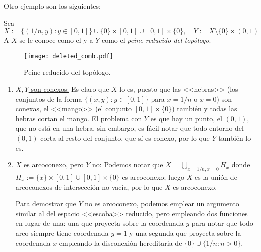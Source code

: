 \documentclass[topologia-analisis.tex]{subfiles}
\begin{document}
Otro ejemplo son los siguientes:
\begin{ex}
	Sea
	$$ X := \{(1/n, y) : y\in [0,1]\} \cup \{0\}\times[0,1] \cup [0,1]\times\{0\}, \quad Y := X \setminus \{0\} \times (0, 1) $$
	A $X$ se le conoce como el  y a $Y$ como el \textit{peine reducido del topólogo}.

	\begin{figure}[!hbt]
		\centering
		\texttt{[image: deleted\_comb.pdf]}
		\caption{Peine reducido del topólogo.}%
		\label{fig:deleted_comb}
	\end{figure}
	\begin{enumerate}
		\item \underline{$X, Y$ son conexos:}
			Es claro que $X$ lo es, puesto que las <<hebras>> (los conjuntos de la forma $\{(x, y) : y\in[0,1]\}$ para $x = 1/n$ o $x = 0$)
			son conexas, el <<mango>> (el conjunto $[0, 1]\times\{0\}$) también y todas las hebras cortan el mango.
			El problema con $Y$ es que hay un punto, el $(0, 1)$, que no está en una hebra, sin embargo, es fácil notar que todo entorno del $(0, 1)$
			corta al resto del conjunto, que sí es conexo, por lo que $Y$ también lo es.

		\item \underline{$X$ es arcoconexo, pero $Y$ no:}
			Podemos notar que $X = \bigcup_{x = 1/n, x=0} H_x$ donde $H_x := \{x\}\times[0, 1] \cup [0,1]\times\{0\}$ es arcoconexo;
			luego $X$ es la unión de arcoconexos de intersección no vacía, por lo que $X$ es arcoconexo.

			Para demostrar que $Y$ no es arcoconexo, podemos emplear un argumento similar al del espacio <<escoba>> reducido,
			pero empleando dos funciones en lugar de una: una que proyecta sobre la coordenada $y$ para notar que todo arco siempre
			tiene coordenada $y = 1$ y una segunda que proyecta sobre la coordenada $x$
			empleando la disconexión hereditaria de $\{0\} \cup \{1/n: n>0\}$.


\end{enumerate}
\end{ex}
\end{document}
